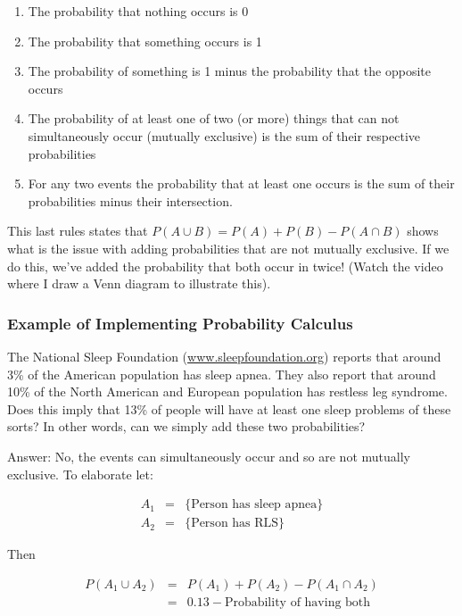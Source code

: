 \documentclass[]{article}
\begin{document}
\begin{enumerate}
\def\labelenumi{\arabic{enumi}.}
\itemsep1pt\parskip0pt
\item
  The probability that nothing occurs is 0
\item
  The probability that something occurs is 1
\item
  The probability of something is 1 minus the probability that the
  opposite occurs
\item
  The probability of at least one of two (or more) things that can not
  simultaneously occur (mutually exclusive) is the sum of their
  respective probabilities
\item
  For any two events the probability that at least one occurs is the sum
  of their probabilities minus their intersection.
\end{enumerate}

This last rules states that $P(A \cup B) = P(A) + P(B)  - P(A \cap B)$
shows what is the issue with adding probabilities that are not mutually
exclusive. If we do this, we've added the probability that both occur in
twice! (Watch the video where I draw a Venn diagram to illustrate this).

\subsubsection{Example of Implementing Probability
Calculus}\label{example-of-implementing-probability-calculus}

The National Sleep Foundation
(\href{http://www.sleepfoundation.org/}{www.sleepfoundation.org})
reports that around 3\% of the American population has sleep apnea. They
also report that around 10\% of the North American and European
population has restless leg syndrome. Does this imply that 13\% of
people will have at least one sleep problems of these sorts? In other
words, can we simply add these two probabilities?

Answer: No, the events can simultaneously occur and so are not mutually
exclusive. To elaborate let:

\begin{eqnarray*}
     A_1 & = & \{\mbox{Person has sleep apnea}\} \\
A_2 & = & \{\mbox{Person has RLS}\}
   \end{eqnarray*}

Then

\begin{eqnarray*}
     P(A_1 \cup A_2 ) & = & P(A_1) + P(A_2) - P(A_1 \cap
A_2) \\
    & = & 0.13 - \mbox{Probability of having both}
   \end{eqnarray*}
\end{document}
